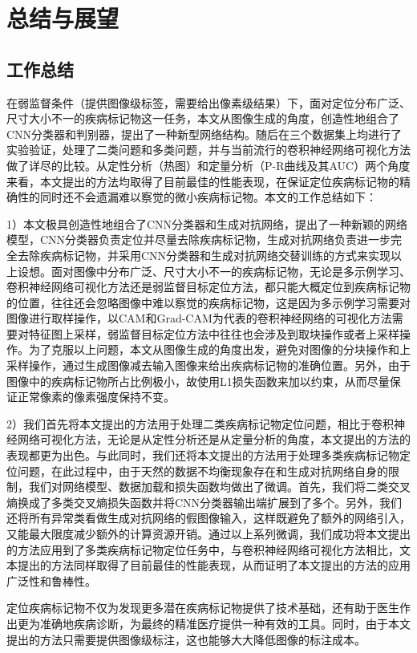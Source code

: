 \chapter{总结与展望}
\section{工作总结}
在弱监督条件（提供图像级标签，需要给出像素级结果）下，面对定位分布广泛、尺寸大小不一的疾病标记物这一任务，本文从图像生成的角度，创造性地组合了CNN分类器和判别器，提出了一种新型网络结构。随后在三个数据集上均进行了实验验证，处理了二类问题和多类问题，并与当前流行的卷积神经网络可视化方法做了详尽的比较。从定性分析（热图）和定量分析（P-R曲线及其AUC）两个角度来看，本文提出的方法均取得了目前最佳的性能表现，在保证定位疾病标记物的精确性的同时还不会遗漏难以察觉的微小疾病标记物。本文的工作总结如下：

1）本文极具创造性地组合了CNN分类器和生成对抗网络，提出了一种新颖的网络模型，CNN分类器负责定位并尽量去除疾病标记物，生成对抗网络负责进一步完全去除疾病标记物，并采用CNN分类器和生成对抗网络交替训练的方式来实现以上设想。面对图像中分布广泛、尺寸大小不一的疾病标记物，无论是多示例学习、卷积神经网络可视化方法还是弱监督目标定位方法，都只能大概定位到疾病标记物的位置，往往还会忽略图像中难以察觉的疾病标记物，这是因为多示例学习需要对图像进行取样操作，以CAM和Grad-CAM为代表的卷积神经网络的可视化方法需要对特征图上采样，弱监督目标定位方法中往往也会涉及到取块操作或者上采样操作。为了克服以上问题，本文从图像生成的角度出发，避免对图像的分块操作和上采样操作，通过生成图像减去输入图像来给出疾病标记物的准确位置。另外，由于图像中的疾病标记物所占比例极小，故使用L1损失函数来加以约束，从而尽量保证正常像素的像素强度保持不变。

2）我们首先将本文提出的方法用于处理二类疾病标记物定位问题，相比于卷积神经网络可视化方法，无论是从定性分析还是从定量分析的角度，本文提出的方法的表现都更为出色。与此同时，我们还将本文提出的方法用于处理多类疾病标记物定位问题，在此过程中，由于天然的数据不均衡现象存在和生成对抗网络自身的限制，我们对网络模型、数据加载和损失函数均做出了微调。首先，我们将二类交叉熵换成了多类交叉熵损失函数并将CNN分类器输出端扩展到了多个。另外，我们还将所有异常类看做生成对抗网络的假图像输入，这样既避免了额外的网络引入，又能最大限度减少额外的计算资源开销。通过以上系列微调，我们成功将本文提出的方法应用到了多类疾病标记物定位任务中，与卷积神经网络可视化方法相比，文本提出的方法同样取得了目前最佳的性能表现，从而证明了本文提出的方法的应用广泛性和鲁棒性。

定位疾病标记物不仅为发现更多潜在疾病标记物提供了技术基础，还有助于医生作出更为准确地疾病诊断，为最终的精准医疗提供一种有效的工具。同时，由于本文提出的方法只需要提供图像级标注，这也能够大大降低图像的标注成本。

